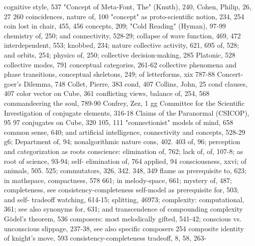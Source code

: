 cognitive style, 537                              "Concept of Meta-Font, The" (Knuth), 240,
Cohen, Philip, 26, 27                              260
coincidences, nature of, 100                      "concept" as proto-scientific notion, 234, 254
coin lost in chair, 455, 456                       concepts, 209;
"Cold Reading" (Hyman), 97-99                     chemistry of, 250; and connectivity, 528-29;
collapse of wave function, 469, 472                interdependent, 553; knobbed, 234; nature
collective activity, 621, 695                      of, 528; and orbits, 254; physics of, 250;
collective decision-making, 285                    Platonic, 528
collective modes, 791                             conceptual categories, 261-62
collective phenomena and phase transitions,       conceptual skeletons, 249; of letterforms, xix
 787-88                                           Concert-goer's Dilemma, 748
Collet, Pierre, 383                               cond, 407
Collins, John, 25                                 cond clauses, 407
color vector on Cube, 361                         conflicting views, balance of, 254, 568
commandeering the soul, 789-90                    Confrey, Zez, 1 gg
Committee for the Scientific Investigation of     conjugate elements, 316-18
 Claims of the Paranormal (CSICOP), 95 97         conjugates on Cube, 320
 105, 111                                         "connectionist" models of mind, 658
common sense, 640; and artificial intelligence,   connectivity and concepts, 528-29
 g6; Department of, 94; nonalgorithmic nature     cons, 402. 403
 of, 96; perception and categorization as roots   conscience: elimination of, 762; lack of,
 of, 107-8; as root of science, 93-94; self-       elimination of, 764
 applied, 94                                      consciousness, xxvi; of animals, 505. 525;
commutators, 326, 342. 348, 349                    flame as prerequisite to, 623; in mathspace,
compactness, 578                                   661; in melody-space, 661; mystery of, 487;
completeness, see consistency-completeness         self-model as prerequisite for, 503; and self-
 tradeoff                                          watching, 614-15; splitting, 46973;
complexity: computational, 361; see also           synonyms for, 631; and transcendence of
 compounding complexity                            Gödel’s theorem, 536
composers: most melodically gifted, 541-42;       conscious vs. unconscious slippage, 237-38,
 see also specific composers                       254
composite identity of knight's move, 593          consistency-completeness tradeoff, 8, 58, 263-
